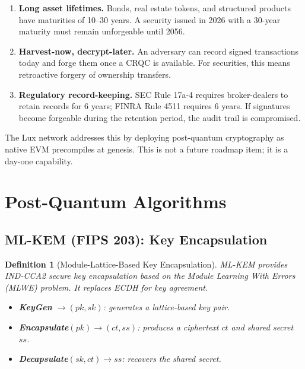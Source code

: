 \documentclass[11pt,a4paper]{article}
\newtheorem{definition}{Definition}[section]
\begin{document}
\begin{enumerate}[nosep]
  \item \textbf{Long asset lifetimes.}  Bonds, real estate tokens, and
        structured products have maturities of 10--30 years.  A security
        issued in 2026 with a 30-year maturity must remain unforgeable
        until 2056.
  \item \textbf{Harvest-now, decrypt-later.}  An adversary can record
        signed transactions today and forge them once a CRQC is
        available.  For securities, this means retroactive forgery of
        ownership transfers.
  \item \textbf{Regulatory record-keeping.}  SEC Rule 17a-4 requires
        broker-dealers to retain records for 6 years; FINRA Rule 4511
        requires 6 years.  If signatures become forgeable during the
        retention period, the audit trail is compromised.
\end{enumerate}

The Lux network addresses this by deploying post-quantum cryptography
as native EVM precompiles at genesis.  This is not a future roadmap
item; it is a day-one capability.

\section{Post-Quantum Algorithms}
\label{sec:algorithms}

\subsection{ML-KEM (FIPS 203): Key Encapsulation}

\begin{definition}[Module-Lattice-Based Key Encapsulation]
ML-KEM provides IND-CCA2 secure key encapsulation based on the
Module Learning With Errors (MLWE) problem.  It replaces ECDH for
key agreement.

\begin{itemize}[nosep]
  \item \textbf{KeyGen} $\rightarrow (pk, sk)$: generates a lattice-based
        key pair.
  \item \textbf{Encapsulate}$(pk) \rightarrow (ct, ss)$: produces a
        ciphertext $ct$ and shared secret $ss$.
  \item \textbf{Decapsulate}$(sk, ct) \rightarrow ss$: recovers the
        shared secret.
\end{itemize}
\end{definition}
\end{document}
